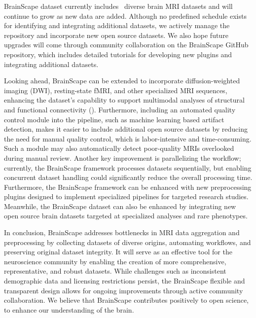 BrainScape dataset currently includes \NumDatasets\ diverse brain MRI datasets and will continue to grow as new data are added. 
Although no predefined schedule exists for identifying and integrating additional datasets, 
we actively manage the repository and incorporate new open source datasets. 
We also hope future upgrades will come through community collaboration on the BrainScape GitHub repository, 
which includes detailed tutorials for developing new plugins and integrating additional datasets.

Looking ahead, BrainScape can be extended to incorporate diffusion-weighted imaging (DWI), resting-state fMRI, 
and other specialized MRI sequences, enhancing the dataset's capability to support multimodal analyses 
of structural and functional connectivity (\cite{van2013wu}). 
Furthermore, including an automated quality control module into the pipeline, such as machine learning based artifact detection, 
makes it easier to include additional open source datasets by reducing the need for manual quality control, which is labor-intensive and time-consuming. 
Such a module may also automatically detect poor-quality MRIs overlooked during manual review. 
Another key improvement is parallelizing the workflow; currently, the BrainScape framework processes datasets sequentially, 
but enabling concurrent dataset handling could significantly reduce the overall processing time. 
Furthermore, the BrainScape framework can be enhanced with new preprocessing plugins designed to implement specialized pipelines for targeted research studies.
Meanwhile, the BrainScape dataset can also be enhanced by integrating new open source brain datasets 
targeted at specialized analyses and rare phenotypes.

In conclusion, BrainScape addresses bottlenecks in MRI data aggregation and preprocessing by 
collecting datasets of diverse origins, automating workflows, and preserving original dataset integrity. 
It will serve as an effective tool for the neuroscience community by enabling the creation of more comprehensive, representative, and robust datasets.
While challenges such as inconsistent demographic data and licensing restrictions persist, 
the BrainScape flexible and transparent design allows for ongoing improvements through active community collaboration.
We believe that BrainScape contributes positively to open science, to enhance our understanding of the brain.